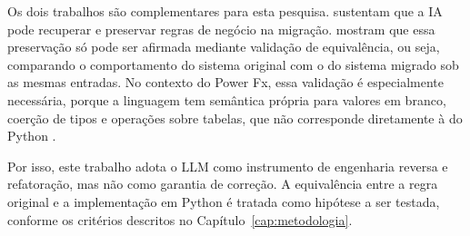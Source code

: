Os dois trabalhos são complementares para esta pesquisa.  sustentam que a IA pode recuperar e preservar regras de negócio na migração.  mostram que essa preservação só pode ser afirmada mediante validação de equivalência, ou seja, comparando o comportamento do sistema original com o do sistema migrado sob as mesmas entradas. No contexto do Power Fx, essa validação é especialmente necessária, porque a linguagem tem semântica própria para valores em branco, coerção de tipos e operações sobre tabelas, que não corresponde diretamente à do Python \cite{powerfxdocs}.

Por isso, este trabalho adota o LLM como instrumento de engenharia reversa e refatoração, mas não como garantia de correção. A equivalência entre a regra original e a implementação em Python é tratada como hipótese a ser testada, conforme os critérios descritos no Capítulo~\ref{cap:metodologia}.
